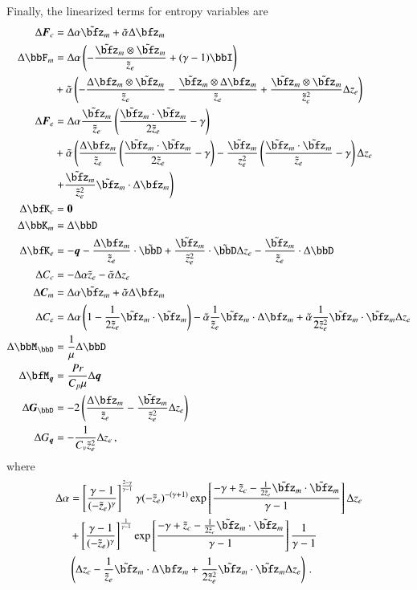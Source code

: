 \documentclass[preprint,12pt]{elsarticle}
\begin{document}
Finally, the linearized terms for entropy variables are
\begin{align*}
\Delta\bfF_c&=\Delta\alpha\tilde\bfz_m+\tilde\alpha\Delta\bfz_m\\
\Delta\bbF_m&=
\Delta\alpha\LRp{-\frac{\tilde\bfz_m\otimes\tilde\bfz_m}{\tilde z_e}+(\gamma-1)\bbI}\\
&+\tilde\alpha\LRp{
-\frac{\Delta\bfz_m\otimes\tilde\bfz_m}{\tilde z_e}
-\frac{\tilde\bfz_m\otimes\Delta\bfz_m}{\tilde z_e}
+\frac{\tilde\bfz_m\otimes\tilde\bfz_m}{\tilde z_e^2}\Delta z_e
}\\
\Delta\bfF_e&=
\Delta\alpha\frac{\tilde\bfz_m}{\tilde z_e}\LRp{\frac{\tilde\bfz_m\cdot\tilde\bfz_m}{2\tilde z_e}-\gamma}\\
&+\tilde\alpha\LRp{
\frac{\Delta\bfz_m}{\tilde z_e}\LRp{\frac{\tilde\bfz_m\cdot\tilde\bfz_m}{2\tilde z_e}-\gamma}
-\frac{\tilde\bfz_m}{z_e^2}\LRp{\frac{\tilde\bfz_m\cdot\tilde\bfz_m}{\tilde z_e}-\gamma}\Delta z_e\right.\\
&\left.
+\frac{\tilde\bfz_m}{\tilde z_e^2}
\tilde\bfz_m\cdot\Delta\bfz_m
}\\
\Delta\bfK_c&=\bs0\\
\Delta\bbK_m&=\Delta\bbD\\
\Delta\bfK_e&=-\bfq-\frac{\Delta\bfz_m}{\tilde z_e}\cdot\tilde\bbD
+\frac{\tilde\bfz_m}{\tilde z_e^2}\cdot\tilde\bbD\Delta z_e
-\frac{\tilde\bfz_m}{\tilde z_e}\cdot\Delta\bbD\\
\Delta C_c&=-\Delta\alpha\tilde z_e-\tilde\alpha\Delta z_e\\
\Delta\bfC_m&=\Delta\alpha\tilde\bfz_m+\tilde\alpha\Delta\bfz_m\\
\Delta C_e&=\Delta\alpha\LRp{1-\frac{1}{2\tilde z_e}\tilde\bfz_m\cdot\tilde\bfz_m}
	-\tilde\alpha\frac{1}{\tilde z_e}\tilde\bfz_m\cdot\Delta\bfz_m
	+\tilde\alpha\frac{1}{2\tilde z_e^2}\tilde\bfz_m\cdot\tilde\bfz_m\Delta z_e\\
\Delta\bbM_\bbD&=\frac{1}{\mu}\Delta \bbD\\
\Delta\bfM_{\bfq}&=\frac{Pr}{C_p\mu}\Delta\bfq\\
\Delta\bfG_{\bbD}&=-2\LRp{\frac{\Delta\bfz_m}{\tilde z_e}-\frac{\tilde\bfz_m}{\tilde z_e^2}\Delta z_e}\\
\Delta G_{\bfq}&=-\frac{1}{C_v\tilde z_e^2}\Delta z_e\,,
\end{align*}
where
\begin{align*}
\Delta\alpha&=
\LRs{\frac{\gamma-1}{(-\tilde z_e)^\gamma}}^{\frac{2-\gamma}{\gamma-1}}
\gamma(-\tilde z_e)^{-(\gamma+1)}
\exp\LRs{\frac{-\gamma+\tilde z_c-\frac{1}{2\tilde z_e}\tilde\bfz_m\cdot\tilde\bfz_m}{\gamma-1}}
\Delta z_e\\
&+\LRs{\frac{\gamma-1}{(-\tilde z_e)^\gamma}}^{\frac{1}{\gamma-1}}
\exp\LRs{\frac{-\gamma+\tilde z_c-\frac{1}{2\tilde z_e}\tilde\bfz_m\cdot\tilde\bfz_m}{\gamma-1}}
\frac{1}{\gamma-1}\\
&\LRp{\Delta z_c
-\frac{1}{\tilde z_e}\tilde\bfz_m\cdot\Delta\bfz_m
+\frac{1}{2\tilde z_e^2}\tilde\bfz_m\cdot\tilde\bfz_m\Delta z_e
}\,.
\end{align*}
\end{document}
